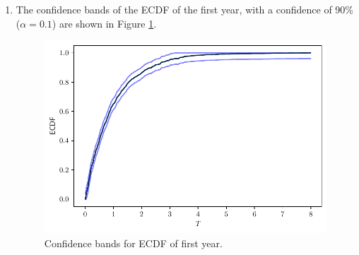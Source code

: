 \documentclass[fleqn]{article}
\begin{document}
\begin{enumerate}[label=\alph*)]
  \item The confidence bands of the ECDF of the first year, with a confidence of
  90\% ($\alpha=0.1$) are shown in Figure \ref{fig:bands}.
  \begin{figure}[H]
    \centering
    \includegraphics[scale=.5]{../figs/ecdf_bands}
    \caption{Confidence bands for ECDF of first year.}
    \label{fig:bands}
  \end{figure}


\end{enumerate}
\end{document}
